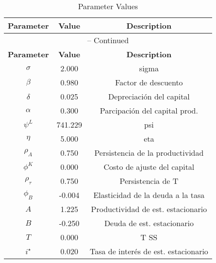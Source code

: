 \begin{center}
\begin{longtable}{ccc}
\caption{Parameter Values}\\%
\toprule%
\multicolumn{1}{c}{\textbf{Parameter}} &
\multicolumn{1}{c}{\textbf{Value}} &
 \multicolumn{1}{c}{\textbf{Description}}\\%
\midrule%
\endfirsthead
\multicolumn{3}{c}{{\tablename} \thetable{} -- Continued}\\%
\midrule%
\multicolumn{1}{c}{\textbf{Parameter}} &
\multicolumn{1}{c}{\textbf{Value}} &
  \multicolumn{1}{c}{\textbf{Description}}\\%
\midrule%
\endhead
$\sigma$ 	 & 	 2.000 	 & 	 sigma\\
$\beta$ 	 & 	 0.980 	 & 	 Factor de descuento\\
$\delta$ 	 & 	 0.025 	 & 	 Depreciación del capital\\
$\alpha$ 	 & 	 0.300 	 & 	 Parcipación del capital prod.\\
$\psi^L$ 	 & 	 741.229 	 & 	 psi\\
$\eta$ 	 & 	 5.000 	 & 	 eta\\
$\rho_{A}$ 	 & 	 0.750 	 & 	 Persistencia de la productividad\\
$\phi^{K}$ 	 & 	 0.000 	 & 	 Costo de ajuste del capital\\
$\rho_{\tau}$ 	 & 	 0.750 	 & 	 Persistencia de T\\
$\phi_{B}$ 	 & 	 -0.004 	 & 	 Elasticidad de la deuda a la tasa\\
$A$ 	 & 	 1.225 	 & 	 Productividad de est. estacionario\\
$B$ 	 & 	 -0.250 	 & 	 Deuda de est. estacionario\\
$T$ 	 & 	 0.000 	 & 	 T SS\\
$i^{\star}$ 	 & 	 0.020 	 & 	 Tasa de interés de est. estacionario\\
\bottomrule%
\end{longtable}
\end{center}
